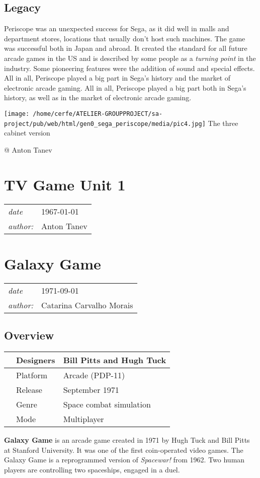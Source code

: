 \documentclass[a4paper,10pt]{book}
\newcommand{\pageHeader}[4]{
    \section{#1}
    \vspace{-0.3cm}
    \begin{table}[h!]
     \begin{tabular}{ll}
        \hline
        \textit{date} & #2 \\
        \textit{author: } & #3\\
        \hline
     \end{tabular}
    \end{table}
    \vspace{-0.3cm}
}
\begin{document}
 
 \subsection{Legacy }
 
        Periscope was an unexpected success for Sega, as it did well in malls and department stores, locations that usually don't host such machines. The game
        was successful both in Japan and abroad. It created the standard for all future arcade games in the US and is described by some people as a  \textit{turning point }
        in the industry. Some pioneering features were the addition of sound and special effects. All in all, Periscope played a big part in Sega's history and the market of electronic arcade gaming.
         All in all, Periscope played a big part both in Sega's history, as well
        as in the market of electronic arcade gaming. 
 
 
 
 \texttt{[image: /home/cerfe/ATELIER-GROUPPROJECT/sa-project/pub/web/html/gen0\_sega\_periscope/media/pic4.jpg]}
 The three cabinet version 
 
 
 
 @ Anton Tanev 
 
 \newpage\pageHeader{TV Game Unit 1}{1967-01-01}{Anton Tanev}{The first of several video game test units for interactive games}\newpage\pageHeader{Galaxy Game}{1971-09-01}{Catarina Carvalho Morais}{Galaxy game, an arcade game created in 1971}
 \subsection{Overview }
 \begin{longtable}{p{1mm}|l|l|}\hline
 
 & Designers 
 & Bill Pitts and Hugh Tuck 
 \\\hline
 
 & Platform 
 & Arcade (PDP-11) 
 \\\hline
 
 & Release 
 & September 1971 
 \\\hline
 
 & Genre 
 & Space combat simulation 
 \\\hline
 
 & Mode 
 & Multiplayer 
 \\\hline
 \end{longtable}
 
 
 \textbf{Galaxy Game }  is an arcade game created in 1971 by Hugh Tuck and Bill Pitts at Stanford University.
          It was one of the first coin-operated video games. 
          The Galaxy Game is a reprogrammed version of  \textit{Spacewar! } from 1962. Two human players are controlling two spaceships, engaged in a duel.  
 
\end{document}
